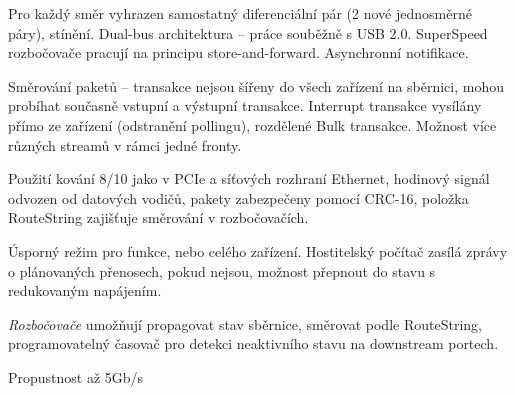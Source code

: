 \documentclass[a4paper, 11pt]{report}
\begin{document}
Pro každý směr vyhrazen samostatný diferenciální pár (2 nové jednosměrné páry), stínění. Dual-bus architektura -- práce souběžně s USB 2.0. SuperSpeed rozbočovače pracují na principu store-and-forward. Asynchronní notifikace.

Směrování paketů -- transakce nejsou šířeny do všech zařízení na sběrnici, mohou probíhat současně vstupní a výstupní transakce. Interrupt transakce vysílány přímo ze zařízení (odstranění pollingu), rozdělené Bulk transakce. Možnost více různých streamů v rámci jedné fronty.

Použití kování 8/10 jako v PCIe a síťových rozhraní Ethernet, hodinový signál odvozen od datových vodičů, pakety zabezpečeny pomocí CRC-16, položka RouteString zajišťuje směrování v rozbočovačích.

Úsporný režim pro funkce, nebo celého zařízení. Hostitelský počítač zasílá zprávy o plánovaných přenosech, pokud nejsou, možnost přepnout do stavu s redukovaným napájením.

\emph{Rozbočovače} umožňují propagovat stav sběrnice, směrovat podle RouteString, programovatelný časovač pro detekci neaktivního stavu na downstream portech.

Propustnost až 5Gb/s
\end{document}
